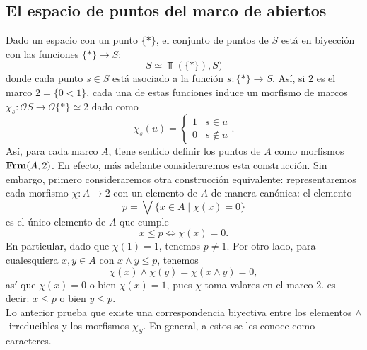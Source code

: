 \documentclass{comunicaciones}
\begin{document}
\subsection{El espacio de puntos del marco de abiertos}
Dado un espacio con un punto $\{*\}$, el conjunto de puntos de $S$ está en biyección con las funciones $\{*\}\to S$:
\[
S\simeq \Top(\{*\}), S)
\]
donde cada punto $s\in S$ está asociado a la función $s\colon \{*\}\to S$. Así, si $2$ es el marco $2=\{0<1\}$, cada una de estas funciones induce un morfismo de marcos $\chi_s\colon \mathcal{O}S\to \mathcal{O}\{*\}\simeq 2$ dado como
\[
  \chi_s(u) =
  \begin{cases}
    1 & s\in u \\
    0 & s\not\in u
  \end{cases}
.\]
Así, para cada marco $A$, tiene sentido definir los puntos de $A$ como morfismos $\mathbf{Frm}(A,2)$.
En efecto, más adelante consideraremos esta construcción.
Sin embargo, primero consideraremos otra construcción equivalente:
representaremos cada morfismo $\chi:A\to 2$ con un elemento de
$A$ de manera canónica: el elemento
\[
    p = \bigvee\{x\in A\mid \chi(x)=0\}
\]
es el único elemento de $A$ que cumple
\[
    x\leq p \Leftrightarrow \chi(x) = 0
.\]
En particular, dado que $\chi(1)=1$, tenemos $p\neq 1$.
Por otro lado, para cualesquiera $x,y\in A$ con
$x\wedge y\leq p$, tenemos
\[
    \chi(x)\wedge \chi(y)=\chi(x\wedge y)=0
,\]
así que $\chi(x)=0$ o bien $\chi(x)=1$, pues $\chi$ toma valores
en el marco $2$. es decir: $x\leq p$ o bien $y\leq p$.\\

Lo anterior prueba que existe una correspondencia biyectiva entre los elementos $\wedge$-irreducibles y los morfismos $\chi_S$. En general, a estos se les conoce como caracteres.
\end{document}
